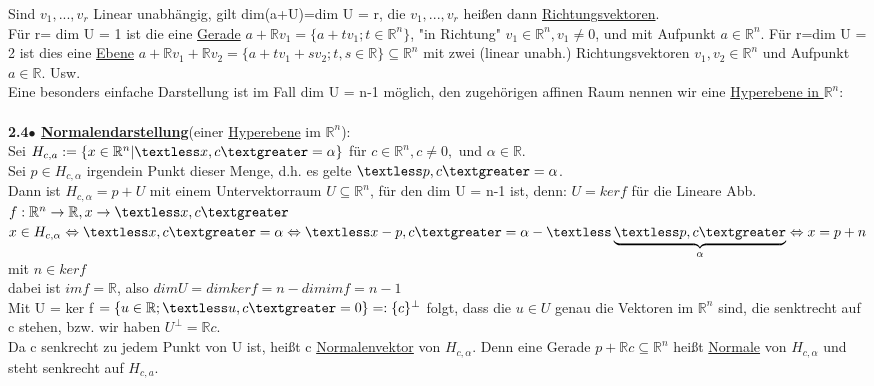 \documentclass[]{scrartcl}
\newcommand{\redcircle}[1]{%
	\tikz[baseline=(char.base)]{
		\node[shape=circle, draw=red, text=red, thick, inner sep=1pt] (char) 
		{\textbf{#1}};
	}%
}
\begin{document}
Sind $v_1,...,v_r$ Linear unabhängig, gilt dim(a+U)=dim U = r, die 
$v_1,...,v_r$ heißen dann \ul{Richtungsvektoren}.\\
Für r= dim U = 1 ist die eine \ul{Gerade} $a + \mathbb{R}v_1 = \{a+tv_1; 
t\in\mathbb{R}^n\}$, "in Richtung" $v_1\in \mathbb{R}^n, v_1\neq 0$, und mit 
Aufpunkt $a \in \mathbb{R}^n$. Für r=dim U = 2  ist dies eine \ul{Ebene} $a + 
\mathbb{R}v_1 + \mathbb{R}v_2 = \{a+tv_1+sv_2; t,s \in 
\mathbb{R}\}\subseteq\mathbb{R}^n$ mit zwei (linear unabh.) Richtungsvektoren 
$v_1,v_2\in \mathbb{R}^n$ und Aufpunkt $a\in \mathbb{R}$. Usw.\\
Eine besonders einfache Darstellung ist im Fall dim U = n-1 möglich, den 
zugehörigen affinen Raum nennen wir eine \ul{Hyperebene in $\mathbb{R}^n$}:\\
\\
\textbf{2.4$\bullet$ \underline{Normalendarstellung}}(einer \ul{Hyperebene} im 
$\mathbb{R}^n$):\\
Sei  $H_{c,a}:=\{x\in\mathbb{R}^n|\textless x,c\textgreater 
= \alpha\}$ für $c \in \mathbb{R}^n, c\neq 0,$ und $\alpha \in \mathbb{R}.$\\
Sei $p\in H_{c,\alpha}$ irgendein Punkt dieser Menge, d.h. es gelte $\textless 
p,c \textgreater = \alpha$.\\
Dann ist $H_{c,\alpha} = p+U$ mit einem Untervektorraum $U\subseteq  \mathbb{R}^n$, für den dim U = n-1 ist, denn: $U=ker f$ für die Lineare Abb. $f:\mathbb{R}^n \rightarrow \mathbb{R}, x \rightarrow\textless x,c\textgreater\\
$\textopencorner$ x \in H_{c,\alpha}\Leftrightarrow \textless x,c \textgreater = \alpha \Leftrightarrow\textless x-p,c \textgreater = \alpha - \textless \underbrace{\textless p,c \textgreater}_{\alpha} \Leftrightarrow x = p+n$ mit $ n \in ker f $\textcorner\\
dabei ist  $imf=\mathbb{R}$, also $dim U= dim ker f = n - dim imf =n-1$\\
Mit U = ker f $=\{u \in \mathbb{R}; \textless u,c \textgreater = 0\} =: \{c\}^{\bot}$ folgt, dass die $u\in U$ genau die Vektoren im $\mathbb{R}^n$ sind, die senktrecht auf c stehen, bzw. wir haben  \ul{$U^{\bot}=\mathbb{R}c$}.\redcircle{Ü}\\
Da c senkrecht zu jedem Punkt von U ist, heißt c \ul{Normalenvektor} von $H_{c,\alpha}$.
Denn eine Gerade $p+\mathbb{R}c\subseteq \mathbb{R}^n$
 heißt \ul{Normale} von $H_{c,\alpha}$ und steht senkrecht auf $H_{c,a}$.\\\\
\end{document}
